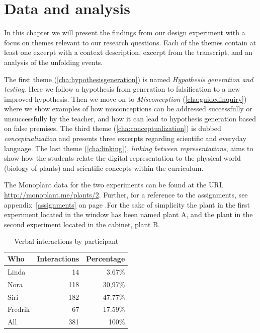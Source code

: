 \chapter{Data and analysis}
In this chapter we will present the findings from our design experiment with a focus on themes relevant to our research questions. Each of the themes contain at least one excerpt with a context description, excerpt from the transcript, and an analysis of the unfolding events. 

The first theme (\ref{cha:hypothesisgeneration}) is named \textit{Hypothesis generation and testing}. Here we follow a hypothesis from generation to falsification to a new improved hypothesis. Then we move on to \textit{Misconception} (\ref{cha:guidedinquiry}) where we show examples of how misconceptions can be addressed successfully or unsuccessfully by the teacher, and how it can lead to hypothesis generation based on false premises. The third theme (\ref{cha:conceptualization}) is dubbed \textit{conceptualization} and presents three excerpts regarding scientific and everyday language. The last theme (\ref{cha:linking}), \textit{linking between representations}, aims to show how the students relate the digital representation to the physical world (biology of plants) and scientific concepts within the curriculum.  

The Monoplant data for the two experiments can be found at the URL \url{http://monoplant.me/plants/2}. Further, for a reference to the assignments, see appendix~\ref{assignments} on page \pageref{assignments}.For the sake of simplicity the plant in the first experiment located in the window has been named plant A, and the plant in the second experiment located in the cabinet, plant B.


\begin{table}[H]
\begin{center}
	\begin{tabular}{l r r } \toprule
	Who &  Interactions  & Percentage\\ \midrule  
	Linda &	 14  & 3.67\% \\
	Nora&	118 & 30,97\% \\ 
	Siri& 	182 & 47.77\% \\
	Fredrik& 67 & 17.59\% \\ \midrule
	All &	381 & 100\%\\
	\bottomrule
	\end{tabular}
\end{center}
\caption{Verbal interactions by participant}
\end{table}

